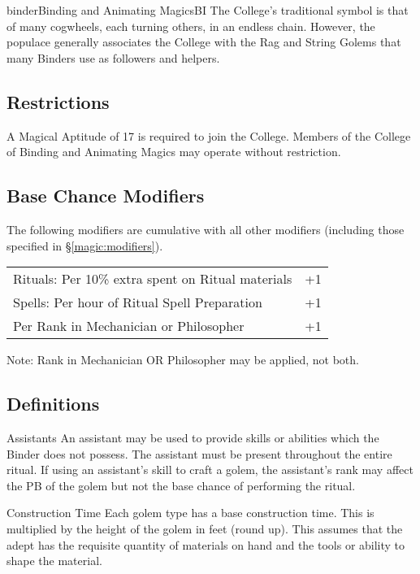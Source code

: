 \begin{college}[1.1]{binder}{Binding and Animating Magics}{BI}
The College's traditional symbol is that of many cogwheels, each
turning others, in an endless chain. However, the populace generally
associates the College with the Rag and String Golems that many
Binders use as followers and helpers.

\subsection{Restrictions}

A Magical Aptitude of 17 is required to join the College.  Members of
the College of Binding and Animating Magics may operate without
restriction.

\subsection{Base Chance Modifiers}

The following modifiers are cumulative with all other modifiers
(including those specified in \S\ref{magic:modifiers}).

\begin{tabularx}{\linewidth}{Xr}
Rituals: Per 10\% extra spent on Ritual materials & +1 \\
Spells: Per hour of Ritual Spell Preparation    & +1 \\
Per Rank in Mechanician or Philosopher    & +1 \\
\end{tabularx}

Note: Rank in Mechanician OR Philosopher may be applied, not both.

\subsection{Definitions}

\begin{Description}
\item[Assistants] An assistant may be used to provide skills or
abilities which the Binder does not possess. The assistant must be
present throughout the entire ritual. If using an assistant's skill to
craft a golem, the assistant's rank may affect the PB of the golem but
not the base chance of performing the ritual.

\item[Construction Time] Each golem type has a base construction
time. This is multiplied by the height of the golem in feet (round
up).  This assumes that the adept has the requisite quantity of
materials on hand and the tools or ability to shape the material.


\end{Description}
\end{college}
